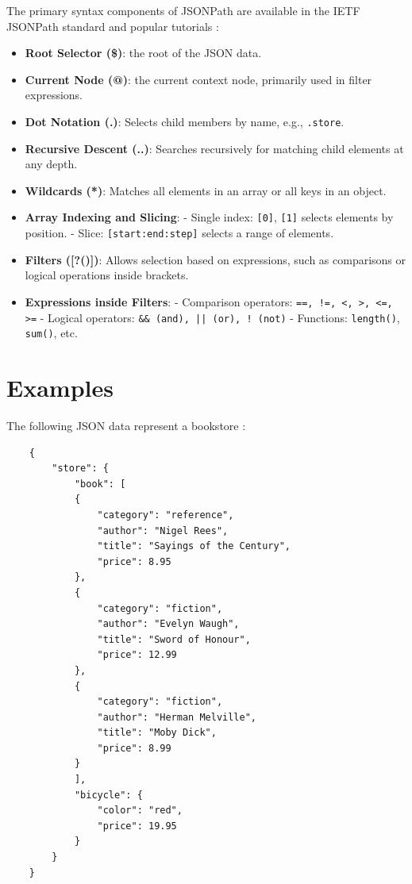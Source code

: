 The primary syntax components of JSONPath are available in the IETF JSONPath standard \cite{ietf_rfc9535} and popular tutorials \cite{toolsqa_jsonpath, azure_jsonpath}:

\begin{itemize}
	\item \textbf{Root Selector (\$)}: the root of the JSON data.
	\item \textbf{Current Node (@)}: the current context node, primarily used in filter expressions.
	\item \textbf{Dot Notation (.)}: Selects child members by name, e.g., \texttt{.store}.
	\item \textbf{Recursive Descent (..)}: Searches recursively for matching child elements at any depth.
	\item \textbf{Wildcards (*)}: Matches all elements in an array or all keys in an object.
	\item \textbf{Array Indexing and Slicing}:  
	- Single index: \texttt{[0]}, \texttt{[1]} selects elements by position.  
	- Slice: \texttt{[start:end:step]} selects a range of elements.
	\item \textbf{Filters ([?()])}: Allows selection based on expressions, such as comparisons or logical operations inside brackets.  
	\item \textbf{Expressions inside Filters}:  
	- Comparison operators: \texttt{==, !=, <, >, <=, >=}  
	- Logical operators: \texttt{\&\& (and), || (or), ! (not)}  
	- Functions: \texttt{length()}, \texttt{sum()}, etc.
\end{itemize}

\section{Examples}

The following JSON data represent a bookstore \cite{toolsqa_jsonpath}:

\begin{verbatim}
	{
		"store": {
			"book": [
			{
				"category": "reference",
				"author": "Nigel Rees",
				"title": "Sayings of the Century",
				"price": 8.95
			},
			{
				"category": "fiction",
				"author": "Evelyn Waugh",
				"title": "Sword of Honour",
				"price": 12.99
			},
			{
				"category": "fiction",
				"author": "Herman Melville",
				"title": "Moby Dick",
				"price": 8.99
			}
			],
			"bicycle": {
				"color": "red",
				"price": 19.95
			}
		}
	}
\end{verbatim}


